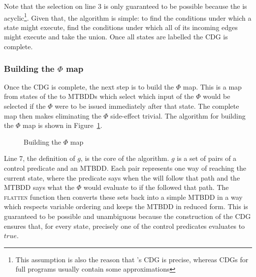 Note that the selection on line 3 is only guaranteed to be possible
because the {\StateMachine} is acyclic\footnote{This assumption is
  also the reason that {\technique}'s CDG is precise, whereas CDGs for
  full programs usually contain some approximations}.  Given that, the
algorithm is simple: to find the conditions under which a state might
execute, find the conditions under which all of its incoming edges
might execute and take the union.  Once all states are labelled the
CDG is complete.

\subsubsection{Building the $\Phi$ map}

Once the CDG is complete, the next step is to build the $\Phi$ map.
This is a map from states of the {\StateMachine} to MTBDDs which
select which input of the $\Phi$ would be selected if the $\Phi$ were
to be issued immediately after that state.  The complete map then
makes eliminating the $\Phi$ side-effect trivial.  The algorithm for
building the $\Phi$ map is shown in
Figure~\ref{fig:derive:phi:phi_map}.

\begin{figure}
\begin{algorithmic}[1]
\EndFor
{}
\EndWhile
\end{algorithmic}
\caption{Building the $\Phi$ map}
\label{fig:derive:phi:phi_map}
\end{figure}


Line 7, the definition of $g$, is the core of the algorithm.  $g$ is a
set of pairs of a control predicate and an MTBDD.  Each pair
represents one way of reaching the current state, where the predicate
says when the {\StateMachine} will follow that path and the MTBDD says
what the $\Phi$ would evaluate to if the {\StateMachine} followed that
path.  The \textsc{flatten} function then converts these sets back
into a simple MTBDD in a way which respects variable ordering and
keeps the MTBDD in reduced form.  This is guaranteed to be possible
and unambiguous because the construction of the CDG ensures that, for
every state, precisely one of the control predicates evaluates to
$\mathit{true}$.

